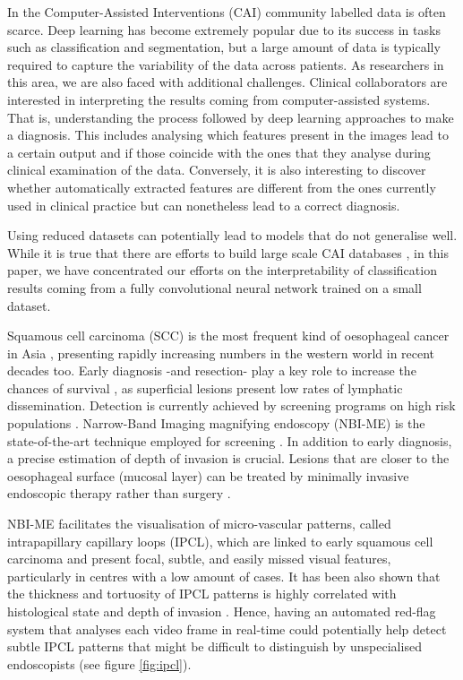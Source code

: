 \documentclass[runningheads]{llncs}
\begin{document}
In the Computer-Assisted Interventions (CAI) community labelled data is often scarce. 
Deep learning has become extremely popular due to its success in tasks such as classification and segmentation, but a large amount of data is typically required to capture the variability of the data across patients.
As researchers in this area, we are also faced with additional challenges. Clinical collaborators are interested in interpreting the results coming from computer-assisted systems. That is, understanding the process followed by deep learning approaches to make a diagnosis. This includes analysing which features present in the images lead to a certain output and if those coincide with the ones that they analyse during clinical examination of the data. Conversely, it is also interesting to discover whether automatically extracted features are different from the ones currently used in clinical practice but can nonetheless lead to a correct diagnosis.


Using reduced datasets can potentially lead to models that do not generalise well. While it is true that there are efforts to build large scale CAI databases \cite{Maier-Hein2017a}, in this paper, we have concentrated our efforts on the interpretability of classification results coming from a fully convolutional neural network trained on a small dataset. 

Squamous cell carcinoma (SCC) is the most frequent kind of oesophageal cancer in Asia \cite{Wang2004}, presenting rapidly increasing numbers in the western world in recent decades too. Early diagnosis -and resection- play a key role to increase the chances of survival \cite{Endo1997}, as superficial lesions present low rates of lymphatic dissemination. Detection is currently achieved by screening programs on high risk populations \cite{Wang2004}. Narrow-Band Imaging magnifying endoscopy (NBI-ME) is the state-of-the-art technique employed for screening \cite{Oyama2017}. In addition to early diagnosis, a precise estimation of depth of invasion is crucial. Lesions that are closer to the oesophageal surface (mucosal layer) can be treated by minimally invasive endoscopic therapy rather than surgery \cite{Ono2006}.

NBI-ME facilitates the visualisation of micro-vascular patterns, called intrapapillary capillary loops (IPCL), which are linked to early squamous cell carcinoma and present focal, subtle, and easily missed visual features, particularly in centres with a low amount of cases. It has been also shown that the thickness and tortuosity of IPCL patterns is highly correlated with histological state and depth of invasion \cite{Oyama2017}. Hence, having an automated red-flag system that analyses each video frame in real-time could potentially help detect subtle IPCL patterns that might be difficult to distinguish by unspecialised endoscopists (see figure \ref{fig:ipcl}).
\end{document}
